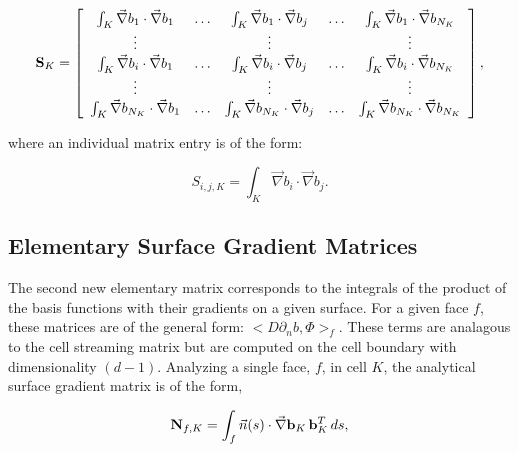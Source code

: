 \begin{equation}
\label{eq::DSA_stiffness_matrix_array}
{\bf S}_K =   \left[
\begin{array} {ccccc}
	\int_K \vec{\nabla}b_1 \cdot \vec{\nabla} b_1  & \ldots & \int_K \vec{\nabla}b_1 \cdot \vec{\nabla} b_j  & \ldots & \int_K \vec{\nabla}b_1 \cdot \vec{\nabla}b_{N_K} \\
	\vdots  &  & \vdots  &  & \vdots \\
	\int_K \vec{\nabla} b_i \cdot \vec{\nabla} b_1  & \ldots & \int_K \vec{\nabla}b_i \cdot \vec{\nabla} b_j  & \ldots & \int_K \vec{\nabla}b_i \cdot \vec{\nabla}b_{N_K} \\
	\vdots  &  & \vdots  &  & \vdots \\
	\int_K \vec{\nabla} b_{N_K}\cdot \vec{\nabla} b_1  & \ldots & \int_K \vec{\nabla} b_{N_K}\cdot \vec{\nabla} b_j  & \ldots & \int_K \vec{\nabla} b_{N_K} \cdot \vec{\nabla} b_{N_K} \\
\end{array}
\right] ,
\end{equation}

\noindent where an individual matrix entry is of the form:

\begin{equation}
\label{eq::DSA_stiffness_matrix_entry}
S_{i,j,K} =  \int_K \vec{\nabla}b_i \cdot \vec{\nabla} b_j .
\end{equation}

\subsection{Elementary Surface Gradient Matrices}
\label{sec::DSA_SIP_SurfaceGradient}

The second new elementary matrix corresponds to the integrals of the product of the basis functions with their gradients on a given surface. For a given face $f$, these matrices are of the general form: $\Big<  D \partial_n b, \Phi \Big>_f$. These terms are analagous to the cell streaming matrix but are computed on the cell boundary with dimensionality $(d-1)$. Analyzing a single face, $f$, in cell $K$, the analytical surface gradient matrix is of the form,

\begin{equation}
\label{eq::DSA_surface_gradient_matrix_analytical}
{\bf N}_{f,K}  =    \int_f \vec{n} (s) \cdot \vec{\nabla} {\bf b}_K \, {\bf b}_K^T \, d s ,
\end{equation}

